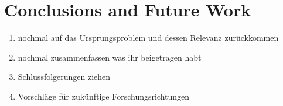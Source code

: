 \section{Conclusions and Future Work}

\begin{enumerate}
	\item nochmal auf das Ursprungsproblem und dessen Relevanz zurückkommen
	\item nochmal zusammenfassen was ihr beigetragen habt
	\item Schlussfolgerungen ziehen
	\item Vorschläge für zukünftige Forschungsrichtungen
\end{enumerate}
